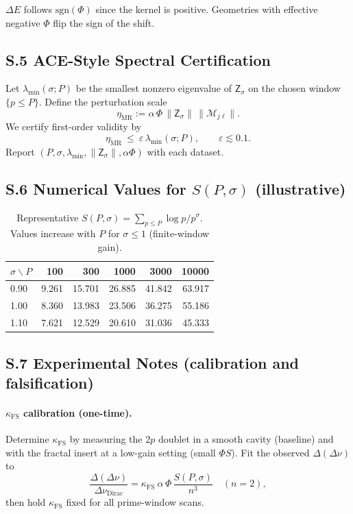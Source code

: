 \documentclass[12]{amsart}
\theoremstyle{plain}
\begin{document}
\begin{remark}[Sign]
$\Delta E$ follows $\mathrm{sgn}(\Phi)$ since the kernel is positive. Geometries with effective negative $\Phi$ flip the sign of the shift.
\end{remark}

\subsection*{S.5 ACE-Style Spectral Certification}

Let $\lambda_{\min}(\sigma;P)$ be the smallest nonzero eigenvalue of $\mathsf Z_\sigma$ on the chosen window $\{p\le P\}$. Define the perturbation scale
\[
\eta_{\mathrm{MR}}:=\alpha\,\Phi\,\|\mathsf Z_\sigma\|\,\|\mathcal M_{j\ell}\|.
\]
We certify first-order validity by
\[
\eta_{\mathrm{MR}}\ \le\ \varepsilon\,\lambda_{\min}(\sigma;P),\qquad \varepsilon\lesssim 0.1.
\]
Report $(P,\sigma,\lambda_{\min},\|\mathsf Z_\sigma\|,\alpha\Phi)$ with each dataset.

\subsection*{S.6 Numerical Values for $S(P,\sigma)$ (illustrative)}

\begin{table}[h]
\centering
\caption{Representative $S(P,\sigma)=\sum_{p\le P}\log p/p^\sigma$. Values increase with $P$ for $\sigma\le 1$ (finite-window gain).}
\label{tab:Svals-new}
\begin{tabular}{@{}lrrrrr@{}}
\toprule
$\sigma\backslash P$ & 100 & 300 & 1000 & 3000 & 10000 \\
\midrule
0.90 & 9.261 & 15.701 & 26.885 & 41.842 & 63.917 \\
1.00 & 8.360 & 13.983 & 23.506 & 36.275 & 55.186 \\
1.10 & 7.621 & 12.529 & 20.610 & 31.036 & 45.333 \\
\bottomrule
\end{tabular}
\end{table}

\subsection*{S.7 Experimental Notes (calibration and falsification)}

\paragraph{\(\kappa_{\mathrm{FS}}\) calibration (one-time).}
Determine $\kappa_{\mathrm{FS}}$ by measuring the $2p$ doublet in a smooth cavity (baseline) and with the fractal insert at a low-gain setting (small $\Phi S$). Fit the observed $\Delta(\Delta\nu)$ to
\[
\frac{\Delta(\Delta \nu)}{\Delta \nu_{\mathrm{Dirac}}}
=\kappa_{\mathrm{FS}}\ \alpha\,\Phi\,\frac{S(P,\sigma)}{n^3}
\quad(n=2),
\]
then hold $\kappa_{\mathrm{FS}}$ fixed for all prime-window scans.
\end{document}
